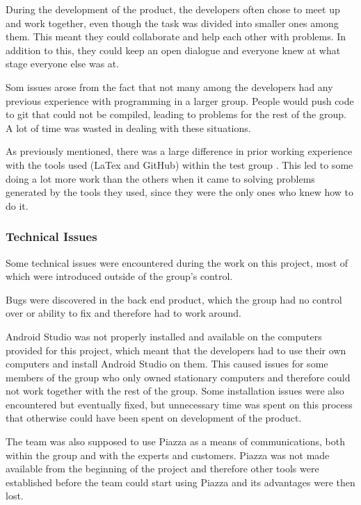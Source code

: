 \documentclass[a4paper]{article}
\begin{document}
During the development of the product, the developers often chose to meet up and work together, even though the task was divided into smaller ones among them. This meant they could collaborate and help each other with problems. In addition to this, they could keep an open dialogue and everyone knew at what stage everyone else was at.

Som issues arose from the fact that not many among the developers had any previous experience with programming in a larger group. People would push code to git that could not be compiled, leading to problems for the rest of the group. A lot of time was wasted in dealing with these situations.

As previously mentioned, there was a large difference in prior working experience with the tools used (LaTex and GitHub) within the test group . This led to some doing a lot more work than the others when it came to solving problems generated by the tools they used, since they were the only ones who knew how to do it.



\subsubsection{Technical Issues}

Some technical issues were encountered during the work on this project, most of which were introduced outside of the group's control.

Bugs were discovered in the back end product, which the group had no control over or ability to fix and therefore had to work around.

Android Studio was not properly installed and available on the computers provided for this project, which meant that the developers had to use their own computers and install Android Studio on them. This caused issues for some members of the group who only owned stationary computers and therefore could not work together with the rest of the group. Some installation issues were also encountered but eventually fixed, but unnecessary time was spent on this process that otherwise could have been spent on development of the product.

The team was also supposed to use Piazza as a means of communications, both within the group and with the experts and customers. Piazza was not made available from the beginning of the project and therefore other tools were established before the team could start using Piazza and its advantages were then lost.
\end{document}
